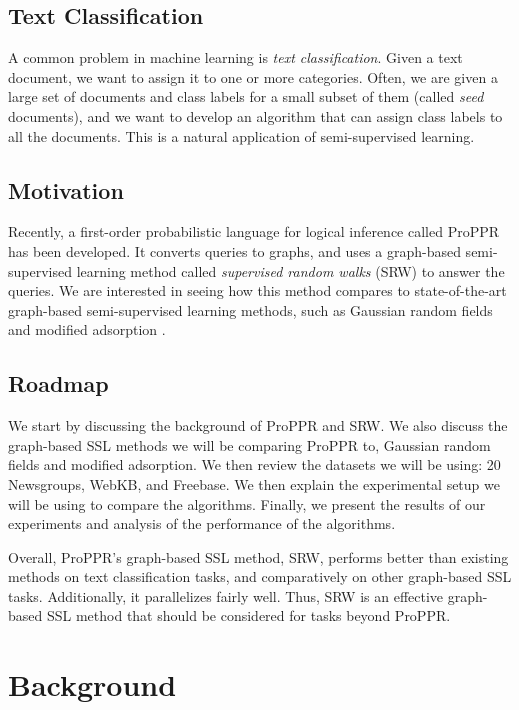 \documentclass[12pt]{article}
\begin{document}
\subsection{Text Classification}
A common problem in machine learning is \textit{text classification}.
Given a text document, we want to assign it to one or more categories.
Often, we are given a large set of documents and class labels for a small subset of them (called \textit{seed} documents), and we want to develop an algorithm that can assign class labels to all the documents.
This is a natural application of semi-supervised learning.

\subsection{Motivation}
Recently, a first-order probabilistic language for logical inference called ProPPR has been developed. \cite{wang2013programming}
It converts queries to graphs, and uses a graph-based semi-supervised learning method called \textit{supervised random walks} (SRW) to answer the queries.
We are interested in seeing how this method compares to state-of-the-art graph-based semi-supervised learning methods, such as Gaussian random fields\cite{zhu2003combining} and modified adsorption \cite{talukdar2009new,talukdar2010experiments}.

\subsection{Roadmap}
We start by discussing the background of ProPPR and SRW.
We also discuss the graph-based SSL methods we will be comparing ProPPR to, Gaussian random fields and modified adsorption.
We then review the datasets we will be using: 20 Newsgroups, WebKB, and Freebase.
We then explain the experimental setup we will be using to compare the algorithms.
Finally, we present the results of our experiments and analysis of the performance of the algorithms.

Overall, ProPPR's graph-based SSL method, SRW, performs better than existing methods on text classification tasks, and comparatively on other graph-based SSL tasks.
Additionally, it parallelizes fairly well.
Thus, SRW is an effective graph-based SSL method that should be considered for tasks beyond ProPPR.

\section{Background}
\end{document}
